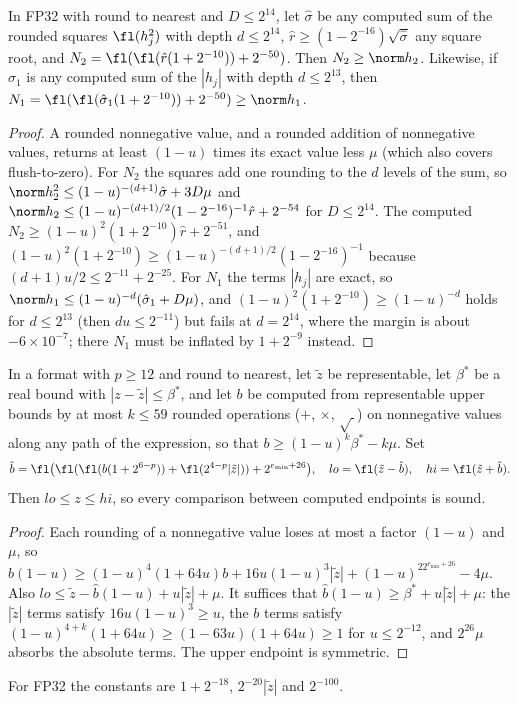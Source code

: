 \begin{lemma}\label{lem:norms}
In FP32 with round to nearest and $D\le2^{14}$, let $\hat\sigma$ be any computed sum of the rounded squares $\fl(h_j^2)$ with depth $d\le2^{14}$, $\hat r\ge(1-2^{-16})\sqrt{\hat\sigma}$ any square root, and $N_2=\fl(\fl(\hat r(1+2^{-10}))+2^{-50})$. Then $N_2\ge\norm h_2$. Likewise, if $\hat\sigma_1$ is any computed sum of the $|h_j|$ with depth $d\le2^{13}$, then $N_1=\fl(\fl(\hat\sigma_1(1+2^{-10}))+2^{-50})\ge\norm h_1$.
\end{lemma}
\begin{proof}
A rounded nonnegative value, and a rounded addition of nonnegative values, returns at least $(1-u)$ times its exact value less $\mu$ (which also covers flush-to-zero). For $N_2$ the squares add one rounding to the $d$ levels of the sum, so $\norm h_2^2\le(1-u)^{-(d+1)}\hat\sigma+3D\mu$ and $\norm h_2\le(1-u)^{-(d+1)/2}(1-2^{-16})^{-1}\hat r+2^{-54}$ for $D\le2^{14}$. The computed $N_2\ge(1-u)^2(1+2^{-10})\hat r+2^{-51}$, and $(1-u)^2(1+2^{-10})\ge(1-u)^{-(d+1)/2}(1-2^{-16})^{-1}$ because $(d+1)u/2\le2^{-11}+2^{-25}$. For $N_1$ the terms $|h_j|$ are exact, so $\norm h_1\le(1-u)^{-d}(\hat\sigma_1+D\mu)$, and $(1-u)^2(1+2^{-10})\ge(1-u)^{-d}$ holds for $d\le2^{13}$ (then $du\le2^{-11}$) but fails at $d=2^{14}$, where the margin is about $-6\times10^{-7}$; there $N_1$ must be inflated by $1+2^{-9}$ instead.
\end{proof}

\begin{lemma}\label{lem:outward}
In a format with $p\ge12$ and round to nearest, let $\tilde z$ be representable, let $\beta^\ast$ be a real bound with $|z-\tilde z|\le\beta^\ast$, and let $b$ be computed from representable upper bounds by at most $k\le59$ rounded operations ($+$, $\times$, $\sqrt{\ }$) on nonnegative values along any path of the expression, so that $b\ge(1-u)^k\beta^\ast-k\mu$. Set
\[\hat b=\fl\bigl(\fl(\fl(b(1+2^{6-p}))+\fl(2^{4-p}|\tilde z|))+2^{e_{\min}+26}\bigr),\quad lo=\fl(\tilde z-\hat b),\quad hi=\fl(\tilde z+\hat b).\]
Then $lo\le z\le hi$, so every comparison between computed endpoints is sound.
\end{lemma}
\begin{proof}
Each rounding of a nonnegative value loses at most a factor $(1-u)$ and $\mu$, so $\hat b(1-u)\ge(1-u)^4(1+64u)b+16u(1-u)^3|\tilde z|+(1-u)^22^{e_{\min}+26}-4\mu$. Also $lo\le\tilde z-\hat b(1-u)+u|\tilde z|+\mu$. It suffices that $\hat b(1-u)\ge\beta^\ast+u|\tilde z|+\mu$: the $|\tilde z|$ terms satisfy $16u(1-u)^3\ge u$, the $b$ terms satisfy $(1-u)^{4+k}(1+64u)\ge(1-63u)(1+64u)\ge1$ for $u\le2^{-12}$, and $2^{26}\mu$ absorbs the absolute terms. The upper endpoint is symmetric.
\end{proof}
For FP32 the constants are $1+2^{-18}$, $2^{-20}|\tilde z|$ and $2^{-100}$.

